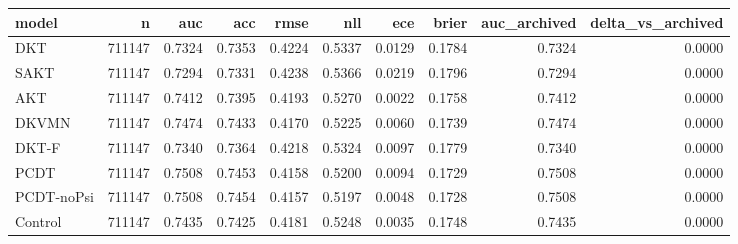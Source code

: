 \begin{tabular}{lrrrrrrrrr}
\toprule
model & n & auc & acc & rmse & nll & ece & brier & auc\_archived & delta\_vs\_archived \\
\midrule
DKT & 711147 & 0.7324 & 0.7353 & 0.4224 & 0.5337 & 0.0129 & 0.1784 & 0.7324 & 0.0000 \\
SAKT & 711147 & 0.7294 & 0.7331 & 0.4238 & 0.5366 & 0.0219 & 0.1796 & 0.7294 & 0.0000 \\
AKT & 711147 & 0.7412 & 0.7395 & 0.4193 & 0.5270 & 0.0022 & 0.1758 & 0.7412 & 0.0000 \\
DKVMN & 711147 & 0.7474 & 0.7433 & 0.4170 & 0.5225 & 0.0060 & 0.1739 & 0.7474 & 0.0000 \\
DKT-F & 711147 & 0.7340 & 0.7364 & 0.4218 & 0.5324 & 0.0097 & 0.1779 & 0.7340 & 0.0000 \\
PCDT & 711147 & 0.7508 & 0.7453 & 0.4158 & 0.5200 & 0.0094 & 0.1729 & 0.7508 & 0.0000 \\
PCDT-noPsi & 711147 & 0.7508 & 0.7454 & 0.4157 & 0.5197 & 0.0048 & 0.1728 & 0.7508 & 0.0000 \\
Control & 711147 & 0.7435 & 0.7425 & 0.4181 & 0.5248 & 0.0035 & 0.1748 & 0.7435 & 0.0000 \\
\bottomrule
\end{tabular}
